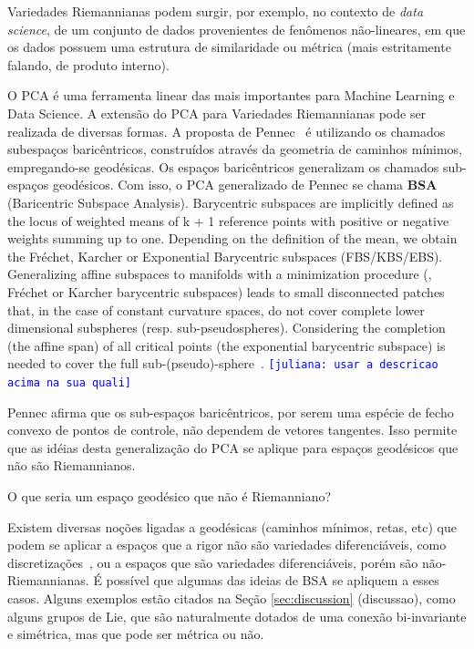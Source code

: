 \documentclass[a4paper,titlepage]{article}
\newcommand{\draftnote}[1]{\marginpar{\tiny\raggedright\textsf{\textcolor{blue}{\hspace{0pt}#1}}}}
\newcommand{\indraftnote}[1]{\textcolor{blue}{\texttt{\footnotesize [#1]}}}
\begin{document}
Variedades Riemannianas podem surgir, por exemplo, no contexto de \emph{data
science}, de um conjunto de dados provenientes de fenômenos não-lineares, em que
os dados possuem uma estrutura de similaridade ou métrica (mais estritamente
falando, de produto interno).

O PCA é uma ferramenta linear das mais importantes para Machine Learning e Data Science.
A extensão do PCA para Variedades Riemannianas pode ser realizada de diversas
formas. A proposta de Pennec~\cite{Pennec:AnnStat:2018,Pennec:Advances:Chapter:2020} é
utilizando os chamados subespaços baricêntricos, construídos através da
geometria de caminhos mínimos, empregando-se geodésicas. Os espaços
baricêntricos generalizam os chamados sub-espaços geodésicos. Com isso,
o PCA generalizado de Pennec se chama \textbf{BSA} (Baricentric Subspace
Analysis). %
\draftnote{BSA: usar esta sigla}%
Barycentric subspaces are implicitly defined
as the locus of weighted means of k + 1 reference points with positive or
negative weights summing up to one. Depending on the definition of the mean, we
obtain the Fréchet, Karcher or Exponential Barycentric subspaces (FBS/KBS/EBS).
Generalizing affine subspaces to manifolds with a minimization procedure (\ie,
Fréchet or Karcher barycentric subspaces) leads to small disconnected patches
that, in the case of constant curvature spaces, do not cover complete lower dimensional subspheres (resp.
sub-pseudospheres). Considering the completion
(the affine span) of all critical points (the exponential barycentric subspace)
is needed to cover the full sub-(pseudo)-sphere~\cite{Pennec:Advances:Chapter:2020}.
\indraftnote{juliana: usar a descricao acima na sua quali}


Pennec afirma que os sub-espaços baricêntricos, por serem 
uma espécie de fecho convexo de pontos de controle, não dependem de vetores
tangentes. Isso permite que as idéias desta generalização do PCA se aplique para
espaços geodésicos que não são Riemannianos.

\begin{question}O que seria um espaço geodésico que não é Riemanniano?
\end{question}
Existem diversas noções ligadas a geodésicas (caminhos mínimos, retas, etc) que
podem se aplicar a espaços que a rigor não são variedades diferenciáveis, como
discretizações~\cite{Video:Geodesics:Crane}, ou a espaços que são variedades
diferenciáveis, porém são não-Riemannianas. É possível que algumas das ideias
de BSA se apliquem a esses casos. Alguns exemplos estão citados na
Seção \ref{sec:discussion} (discussao), como alguns grupos de Lie, que são
naturalmente dotados de uma
conexão bi-invariante e simétrica, mas que pode ser métrica ou não.
\end{document}
